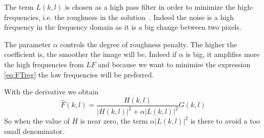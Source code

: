 The term $L(k,l)$ is chosen as a high pass filter in order to minimize the high-frequencies, i.e. the roughness in the solution~\cite{mathWorksReg}. Indeed the noise is a high frequency in the frequency domain as it is a big change between two pixels. 

The parameter $\alpha$ controls the degree of roughness penalty. The higher the coefficient is, the smoother the image will be\cite{mathWorksReg}. Indeed if $\alpha$ is big, it amplifies more the high frequencies from $LF$ and because we want to minimise the expression \eqref{eq:FTreg} the low frequencies will be preferred.

With the derivative we obtain
\begin{equation}
\hat{F}(k,l) = \frac{H(k,l)}{|H(k,l)|^2 + \alpha |L(k,l)|^2} G(k,l)
\end{equation}
So when the value of $H$ is near zero, the term $\alpha |L(k,l)|^2$ is there to avoid a too small denominator. 

